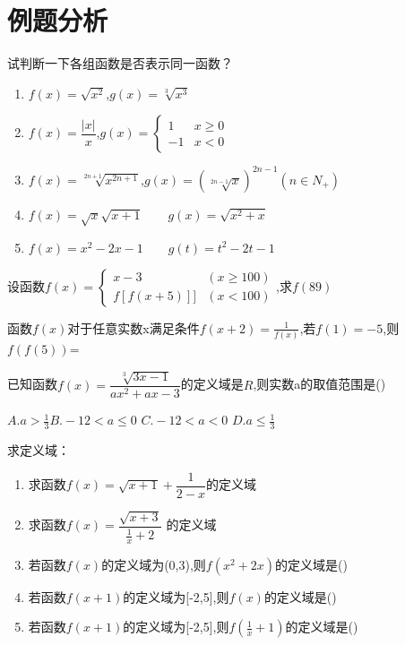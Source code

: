 \section{例题分析}
\begin{example}
	试判断一下各组函数是否表示同一函数？\par
	\begin{enumerate}
		\item $f(x)=\sqrt{x^2}$,\qquad $g(x)=\sqrt[3]{x^3}$
		\item $f(x)=\dfrac{|x|}{x}$,\qquad $g(x)=\begin{cases}
		1 & x \geq 0\\
		-1 & x<0
		\end{cases}$
		\item $f(x)=\sqrt[2n+1]{x^{2n+1}}$,\qquad $g(x)=(\sqrt[2n-1]{x})^{2n-1}(n\in N_+)$
		\item $f(x)=\sqrt{x}\sqrt{x+1}\qquad g(x) =\sqrt{x^2+x}$
		\item $f(x)=x^2-2x-1\qquad g(t)=t^2-2t-1$
	\end{enumerate}
\end{example}
\begin{example}
	设函数$f(x)=\begin{cases}
	 x-3 & (x\geq 100)\\
	f[f(x+5)]]  & (x<100)	
	\end{cases}
		$,求$f(89)$
\end{example}
\vspace{2.8cm}
\begin{example}
	函数$f(x)$对于任意实数x满足条件$f(x+2)=\frac{1}{f(x)}$,若$f(1)=-5$,则$f(f(5))$=
\end{example}
\vspace{2.5cm}
\begin{example}
已知函数$f(x)=\dfrac{\sqrt[3]{3x-1}}{ax^2+ax-3}$的定义域是$R$,则实数a的取值范围是(\quad)\par
$A.a>\frac{1}{3}$\hfil $B.-12<a\leq 0$  \hfil  $C.-12<a<0$  \hfil $D.a\leq \frac{1}{3}$
\end{example}
\begin{example} 求定义域：\par
	\begin{enumerate}
		\item 求函数$f(x)=\sqrt{x+1}+\dfrac{1}{2-x}$的定义域
		\vspace{2.5cm}
		\item 求函数$f(x)=\dfrac{\sqrt{x+3}}{\frac{1}{x}+2}$ 的定义域
		\vspace{2.5cm}
		\item 若函数$f(x)$的定义域为(0,3),则$f(x^2+2x)$的定义域是(\qquad)
		\vspace{2.5cm}
\item 	若函数$f(x+1)$的定义域为[-2,5],则$f(x)$的定义域是(\qquad)
\vspace{2.5cm}
\item 若函数$f(x+1)$的定义域为[-2,5],则$f(\frac{1}{x}+1)$的定义域是(\qquad)
	\end{enumerate}
	\vspace{2.3cm}
\end{example}

